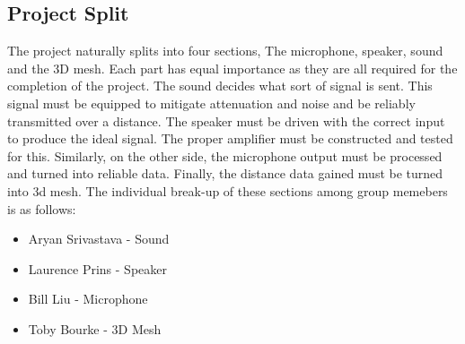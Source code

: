 \subsection{Project Split}

The project naturally splits into four sections, The microphone, speaker, sound and the 3D mesh. Each part has equal importance as they are all required for the completion of the project. The sound decides what sort of signal is sent. This signal must be equipped to mitigate attenuation and noise and be reliably transmitted over a distance. The speaker must be driven with the correct input to produce the ideal signal. The proper amplifier must be constructed and tested for this. Similarly, on the other side, the microphone output must be processed and turned into reliable data. Finally, the distance data gained must be turned into 3d mesh. The individual break-up of these sections among group memebers is as follows:
\begin{itemize}
\item Aryan Srivastava - Sound
\item Laurence Prins - Speaker
\item Bill Liu - Microphone 
\item Toby Bourke - 3D Mesh 
\end{itemize}

